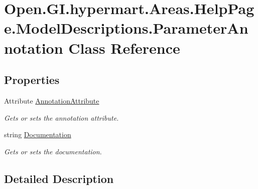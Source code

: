 \hypertarget{class_open_1_1_g_i_1_1hypermart_1_1_areas_1_1_help_page_1_1_model_descriptions_1_1_parameter_annotation}{}\section{Open.\+G\+I.\+hypermart.\+Areas.\+Help\+Page.\+Model\+Descriptions.\+Parameter\+Annotation Class Reference}
\label{class_open_1_1_g_i_1_1hypermart_1_1_areas_1_1_help_page_1_1_model_descriptions_1_1_parameter_annotation}


 


\subsection*{Properties}
\begin{DoxyCompactItemize}
\item 
Attribute \hyperlink{class_open_1_1_g_i_1_1hypermart_1_1_areas_1_1_help_page_1_1_model_descriptions_1_1_parameter_annotation_a53e191aedff647b1d7cd63e2bb2219e0}{Annotation\+Attribute}
\begin{DoxyCompactList}\small\item\em Gets or sets the annotation attribute. \end{DoxyCompactList}\item 
string \hyperlink{class_open_1_1_g_i_1_1hypermart_1_1_areas_1_1_help_page_1_1_model_descriptions_1_1_parameter_annotation_a9bfcc6f5d41c3630187373bbf9993fa4}{Documentation}
\begin{DoxyCompactList}\small\item\em Gets or sets the documentation. \end{DoxyCompactList}\end{DoxyCompactItemize}


\subsection{Detailed Description}




